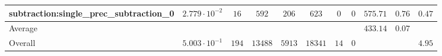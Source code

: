 \begin{tabular}{|l|c|c|c|c|c|c|c|c|c|c|}
subtraction:single\_prec\_subtraction\_0         & $ 2.779 \cdot 10^{-2} $ & $ 16     $ & $ 592   $ & $ 206  $ & $ 623   $ & $ 0  $ & $ 0 $ & $ 575.71      $ & $ 0.76    $ & $ 0.47    $ \\
\hline
Average                                          & $                     $ & $        $ & $       $ & $      $ & $       $ & $    $ & $   $ & $ 433.14      $ & $ 0.07    $ & $         $ \\
\hline
Overall                                          & $ 5.003 \cdot 10^{-1} $ & $ 194    $ & $ 13488 $ & $ 5913 $ & $ 18341 $ & $ 14 $ & $ 0 $ & $             $ & $         $ & $ 4.95    $ \\
\hline
\end{tabular}

